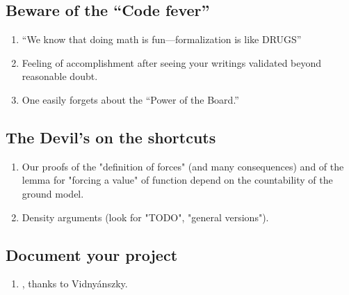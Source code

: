 \subsection{Beware of the “Code fever”}\label{sec:beware-code-fever}
\begin{enumerate}
\item “We know that doing math is fun---formalization is like DRUGS”
\item Feeling of accomplishment after seeing your writings
  validated beyond reasonable doubt.
\item One easily forgets about the “Power of the Board.”
\end{enumerate}

\subsection{The Devil's on the shortcuts}
\begin{enumerate}
\item
  Our proofs of the "definition of forces" (and many
  consequences) and of the lemma for "forcing a value" of function
  depend on the countability of the ground model. 
\item
  Density arguments (look for "TODO", "general versions").
\end{enumerate}

\subsection{Document your project}
\begin{enumerate}
\item {}, thanks to Vidnyánszky.
\end{enumerate}


